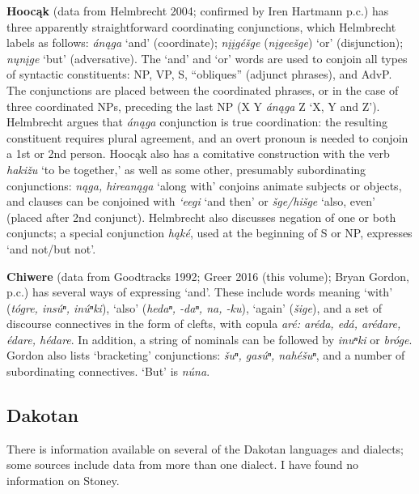 \documentclass[output=paper]{LSP/langsci}
\begin{document}
\textbf{Hooc\k{a}k} (data from Helmbrecht 2004; confirmed by Iren Hartmann p.c.) has three apparently straightforward coordinating conjunctions, which Helmbrecht labels as follows: \textit{\'an\k{a}ga} `and' (coordinate); \textit{n\k{i}\k{i}g\'e\v{s}ge} (\textit{n\k{i}gee\v{s}ge}) `or' (disjunction); \textit{n\k{u}n\k{i}ge} `but' (adversative). The `and' and `or' words are used to conjoin all types of syntactic constituents: NP, VP, S, ``obliques'' (adjunct phrases), and AdvP. The conjunctions are placed between the coordinated phrases, or in the case of three coordinated NPs, preceding the last NP (X Y \textit{\'an\k{a}ga} Z `X, Y and Z'). Helmbrecht argues that \textit{\'an\k{a}ga} conjunction is true coordination: the resulting constituent requires plural agreement, and an overt pronoun is needed to conjoin a 1st or 2nd person. Hooc\k{a}k also has a comitative construction with the verb \textit{haki\v{z}u} `to be together,' as well as some other, presumably subordinating conjunctions: \textit{n\k{a}ga, hirean\k{a}ga} `along with' conjoins animate subjects or objects, and clauses can be conjoined with \textit{`eegi} `and then' or \textit{\v{s}ge/hi\v{s}ge} `also, even' (placed after 2nd conjunct). Helmbrecht also discusses negation of one or both conjuncts; a special conjunction \textit{h\k{a}k\'e}, used at the beginning of S or NP, expresses `and not/but not'.

\textbf{Chiwere} (data from Goodtracks 1992; Greer 2016 (this volume); Bryan Gordon, p.c.) has several ways of expressing `and'. These include words meaning `with' (\textit{t\'ogre, ins\'uⁿ, in\'uⁿki}), `also' (\textit{hedaⁿ, -daⁿ, na, -ku}), `again' (\textit{\v{s}ige}), and a set of discourse connectives in the form of clefts, with copula \textit{ar\'e: ar\'eda, ed\'a, ar\'edare, \'edare, h\'edare}. In addition, a string of nominals can be followed by \textit{inuⁿki} or \textit{br\'oge}. Gordon also lists `bracketing' conjunctions: \textit{\v{s}uⁿ, gas\'uⁿ, nah\'e\v{s}uⁿ}, and a number of subordinating connectives. `But' is \textit{n\'una}.

\subsection{Dakotan}
 
There is information available on several of the Dakotan languages and dialects; some sources include data from more than one dialect. I have found no information on Stoney.
\end{document}
